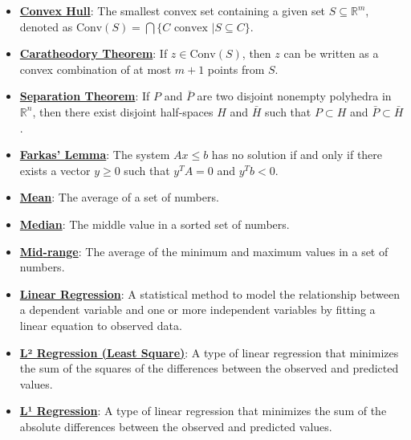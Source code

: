 \documentclass{article}%
\begin{document}
\begin{itemize}[leftmargin=*]
\item \href{https://www.math.purdue.edu/~yipn/421/2024-10-22-Convexity.pdf#page=5}{\textbf{Convex Hull}}: The smallest convex set containing a given set $S \subseteq \mathbb{R}^m$, denoted as $\text{Conv}(S) = \bigcap \{C \text{ convex } | S \subseteq C\}$.%
\item \href{https://www.math.purdue.edu/~yipn/421/2024-10-22-Convexity.pdf#page=8}{\textbf{Caratheodory Theorem}}: If $z \in \text{Conv}(S)$, then $z$ can be written as a convex combination of at most $m+1$ points from $S$.%
\item \href{https://www.math.purdue.edu/~yipn/421/2024-10-22-Convexity.pdf#page=10}{\textbf{Separation Theorem}}: If $P$ and $\bar{P}$ are two disjoint nonempty polyhedra in $\mathbb{R}^n$, then there exist disjoint half-spaces $H$ and $\bar{H}$ such that $P \subset H$ and $\bar{P} \subset \bar{H}$.%
\item \href{https://www.math.purdue.edu/~yipn/421/2024-10-22-Convexity.pdf#page=12}{\textbf{Farkas' Lemma}}: The system $Ax \le b$ has no solution if and only if there exists a vector $y \ge 0$ such that $y^T A = 0$ and $y^T b < 0$.%
\item \href{https://www.math.purdue.edu/~yipn/421/2024-10-22-Regression.pdf#page=1}{\textbf{Mean}}: The average of a set of numbers. %
\item \href{https://www.math.purdue.edu/~yipn/421/2024-10-22-Regression.pdf#page=1}{\textbf{Median}}: The middle value in a sorted set of numbers. %
\item \href{https://www.math.purdue.edu/~yipn/421/2024-10-22-Regression.pdf#page=1}{\textbf{Mid{-}range}}: The average of the minimum and maximum values in a set of numbers. %
\item \href{https://www.math.purdue.edu/~yipn/421/2024-10-22-Regression.pdf#page=2}{\textbf{Linear Regression}}: A statistical method to model the relationship between a dependent variable and one or more independent variables by fitting a linear equation to observed data. %
\item \href{https://www.math.purdue.edu/~yipn/421/2024-10-22-Regression.pdf#page=4}{\textbf{L² Regression (Least Square)}}: A type of linear regression that minimizes the sum of the squares of the differences between the observed and predicted values. %
\item \href{https://www.math.purdue.edu/~yipn/421/2024-10-22-Regression.pdf#page=5}{\textbf{L¹ Regression}}: A type of linear regression that minimizes the sum of the absolute differences between the observed and predicted values. %

\end{itemize}
\end{document}
